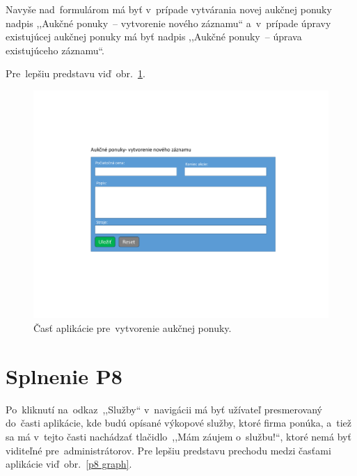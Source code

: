 Navyše nad~formulárom má byť v~prípade vytvárania novej aukčnej ponuky nadpis ,,Aukčné ponuky~-- vytvorenie nového záznamu`` a~v~prípade úpravy existujúcej aukčnej ponuky má byť nadpis ,,Aukčné ponuky~-- úprava existujúceho záznamu``.

Pre~lepšiu predstavu viď~obr.~\ref{auction offer form}.

\begin{figure}[H]\centering
\includegraphics[width=140mm]{../img/UI concept/auction offer form}
\caption{Časť aplikácie pre~vytvorenie aukčnej ponuky.}
\label{auction offer form}
\end{figure}

\section{Splnenie P8}
\label{splnenie p8}

Po~kliknutí na~odkaz~,,Služby`` v~navigácii má byť užívateľ presmerovaný do~časti aplikácie, kde budú opísané výkopové služby, ktoré firma ponúka, a~tiež sa má v~tejto časti nachádzať tlačidlo~,,Mám záujem o~službu!``, ktoré nemá byť viditeľné pre~administrátorov. Pre lepšiu predstavu prechodu medzi časťami aplikácie viď~obr.~\ref{p8 graph}.

